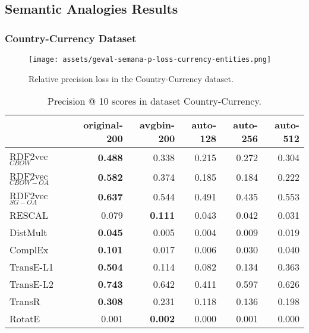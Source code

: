 \documentclass[11pt,titlepage,oneside,openany]{book}
\begin{document}
\newpage


\subsection{Semantic Analogies Results}
\label{subsec:geval-results-semana-dataset}

\subsubsection{Country-Currency Dataset}
\label{subsubsec:geval-results-semana-currency-entities}


\begin{figure}[H]
    \centering
    \texttt{[image: assets/geval-semana-p-loss-currency-entities.png]}
    \vspace*{-3mm}
    \caption{Relative precision loss in the Country-Currency dataset.}
    \label{fig:geval-semana-p-loss-currency-entities}
\end{figure}


\begin{table}[H]
\centering
\begin{tabular}{lrrrrr}
\toprule
{} &  original-200 &  avgbin-200 &  auto-128 &  auto-256 &  auto-512 \\
\midrule
RDF2vec$_{CBOW}$     &	\textbf{0.488} &       0.338  &     0.215  &     0.272  &     0.304  \\
RDF2vec$_{CBOW-OA}$  &	\textbf{0.582} &       0.374  &     0.185  &     0.184  &     0.222  \\
RDF2vec$_{SG-OA}$    &	\textbf{0.637} &       0.544  &     0.491  &     0.435  &     0.553  \\
RESCAL               &         0.079  &	\textbf{0.111} &     0.043  &     0.042  &     0.031  \\
DistMult             &	\textbf{0.045} &       0.005  &     0.004  &     0.009  &     0.019  \\
ComplEx              &	\textbf{0.101} &       0.017  &     0.006  &     0.030  &     0.040  \\
TransE-L1            &	\textbf{0.504} &       0.114  &     0.082  &     0.134  &     0.363  \\
TransE-L2            &	\textbf{0.743} &       0.642  &     0.411  &     0.597  &     0.626  \\
TransR               &	\textbf{0.308} &       0.231  &     0.118  &     0.136  &     0.198  \\
RotatE               &         0.001  &	\textbf{0.002} &     0.000  &     0.001  &     0.000  \\
\bottomrule
\end{tabular}
\caption{Precision @ 10 scores in dataset Country-Currency.}
\label{tab:geval-semana-p-at-10-currency-entities}
\end{table}
\end{document}
